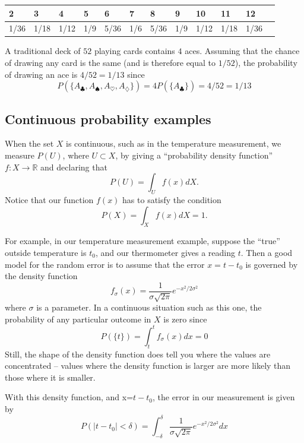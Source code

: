 \documentclass[
  oneside]{scrbook}
\makeatletter
\newcounter{tableno}
\newenvironment{tablenos:no-prefix-table-caption}{
  \caption@ifcompatibility{}{
    \let\oldthetable\thetable
    \let\oldtheHtable\theHtable
    \renewcommand{\thetable}{tableno:\thetableno}
    \renewcommand{\theHtable}{tableno:\thetableno}
    \stepcounter{tableno}
    \captionsetup{labelformat=empty}
  }
}{
  \caption@ifcompatibility{}{
    \captionsetup{labelformat=default}
    \let\thetable\oldthetable
    \let\theHtable\oldtheHtable
    \addtocounter{table}{-1}
  }
}
\makeatother
\begin{document}
\begin{tablenos:no-prefix-table-caption}

\begin{longtable}[]{@{}llllllllllll@{}}
\toprule
2 & 3 & 4 & 5 & 6 & 7 & 8 & 9 & 10 & 11 & 12 & \\
\midrule
\endhead
1/36 & 1/18 & 1/12 & 1/9 & 5/36 & 1/6 & 5/36 & 1/9 & 1/12 & 1/18 & 1/36
& \\
\bottomrule
\end{longtable}

\end{tablenos:no-prefix-table-caption}

A traditional deck of \(52\) playing cards contains \(4\) aces. Assuming
that the chance of drawing any card is the same (and is therefore equal
to \(1/52\)), the probability of drawing an ace is \(4/52=1/13\) since
\[
P(\{A_{\clubsuit},A_{\spadesuit},A_{\heartsuit},A_{\diamondsuit}\}) = 4P(\{A_{\clubsuit}\})=4/52=1/13
\]

\hypertarget{continuous-probability-examples}{%
\subsection{Continuous probability
examples}\label{continuous-probability-examples}}

When the set \(X\) is continuous, such as in the temperature
measurement, we measure \(P(U)\), where \(U\subset X\), by giving a
``probability density function'' \(f:X\to \mathbb{R}\) and declaring
that \[
P(U) = \int_{U}f(x) dX.
\] Notice that our function \(f(x)\) has to satisfy the condition \[
P(X)=\int_{X} f(x)dX = 1.
\]

For example, in our temperature measurement example, suppose the
``true'' outside temperature is \(t_0\), and our thermometer gives a
reading \(t\). Then a good model for the random error is to assume that
the error \(x=t-t_0\) is governed by the density function \[
f_\sigma(x) = \frac{1}{\sigma\sqrt{2\pi}}e^{-x^2/2\sigma^2}
\] where \(\sigma\) is a parameter. In a continuous situation such as
this one, the probability of any particular outcome in \(X\) is zero
since \[
P(\{t\})=\int_{t}^{t}f_{\sigma}(x)dx = 0
\] Still, the shape of the density function does tell you where the
values are concentrated -- values where the density function is larger
are more likely than those where it is smaller.

With this density function, and x=\(t-t_0\), the error in our
measurement is given by \begin{equation}
P(|t-t_0|<\delta)=\int_{-\delta}^{\delta} \frac{1}{\sigma\sqrt{2\pi}}e^{-x^2/2\sigma^2} dx
\label{eq:normal}\end{equation}
\end{document}
